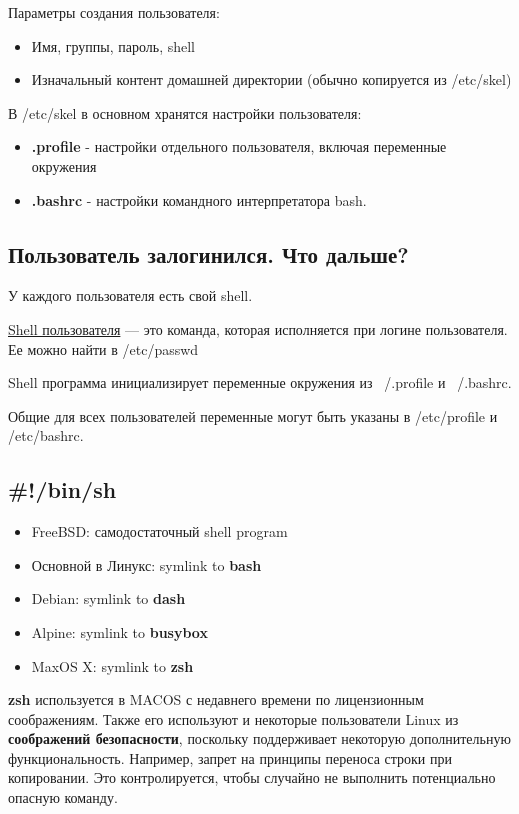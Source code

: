 Параметры создания пользователя:
\begin{itemize}
	\item Имя, группы, пароль, shell
	\item Изначальный контент домашней директории (обычно копируется из /etc/skel)
\end{itemize}

В /etc/skel в основном хранятся настройки пользователя:
\begin{itemize}
	\item \textbf{.profile} - настройки отдельного пользователя, включая переменные окружения
	\item \textbf{.bashrc} - настройки командного интерпретатора bash.
\end{itemize}

\subsection{Пользователь залогинился. Что дальше?}

У каждого пользователя есть свой shell. 

\begin{Def}
	\underline{Shell пользователя} --- это команда, которая исполняется при логине пользователя. Ее можно найти в /etc/passwd
\end{Def}

Shell программа инициализирует переменные окружения из ~/.profile и ~/.bashrc.

Общие для всех пользователей переменные могут быть указаны в /etc/profile и /etc/bashrc.

\subsection{\#!/bin/sh}

\begin{itemize}
	\item FreeBSD: самодостаточный shell program
	\item Основной в Линукс: symlink to \textbf{bash}
	\item Debian: symlink to \textbf{dash}
	\item Alpine: symlink to \textbf{busybox}
	\item MaxOS X: symlink to \textbf{zsh}
\end{itemize}

\textbf{zsh} используется в MACOS с недавнего времени по лицензионным соображениям. 
Также его используют и некоторые пользователи Linux из \textbf{соображений безопасности}, поскольку поддерживает некоторую дополнительную функциональность. Например, запрет на принципы переноса строки при копировании. Это контролируется, чтобы случайно не выполнить потенциально опасную команду. 

